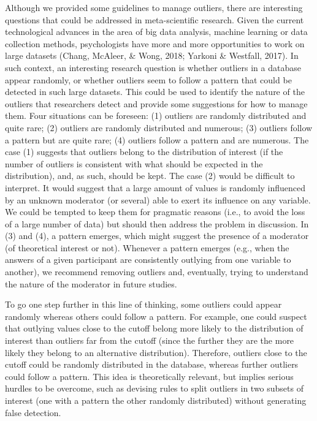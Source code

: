 \documentclass[man,floatsintext]{apa6}
\begin{document}
Although we provided some guidelines to manage outliers, there are interesting questions that could be addressed in meta-scientific research. Given the current technological advances in the area of big data analysis, machine learning or data collection methods, psychologists have more and more opportunities to work on large datasets (Chang, McAleer, \& Wong, 2018; Yarkoni \& Westfall, 2017). In such context, an interesting research question is whether outliers in a database appear randomly, or whether outliers seem to follow a pattern that could be detected in such large datasets. This could be used to identify the nature of the outliers that researchers detect and provide some suggestions for how to manage them. Four situations can be foreseen: (1) outliers are randomly distributed and quite rare; (2) outliers are randomly distributed and numerous; (3) outliers follow a pattern but are quite rare; (4) outliers follow a pattern and are numerous. The case (1) suggests that outliers belong to the distribution of interest (if the number of outliers is consistent with what should be expected in the distribution), and, as such, should be kept. The case (2) would be difficult to interpret. It would suggest that a large amount of values is randomly influenced by an unknown moderator (or several) able to exert its influence on any variable. We could be tempted to keep them for pragmatic reasons (i.e., to avoid the loss of a large number of data) but should then address the problem in discussion. In (3) and (4), a pattern emerges, which might suggest the presence of a moderator (of theoretical interest or not). Whenever a pattern emerges (e.g., when the answers of a given participant are consistently outlying from one variable to another), we recommend removing outliers and, eventually, trying to understand the nature of the moderator in future studies.

To go one step further in this line of thinking, some outliers could appear randomly whereas others could follow a pattern. For example, one could suspect that outlying values close to the cutoff belong more likely to the distribution of interest than outliers far from the cutoff (since the further they are the more likely they belong to an alternative distribution). Therefore, outliers close to the cutoff could be randomly distributed in the database, whereas further outliers could follow a pattern. This idea is theoretically relevant, but implies serious hurdles to be overcome, such as devising rules to split outliers in two subsets of interest (one with a pattern the other randomly distributed) without generating false detection.
\end{document}
